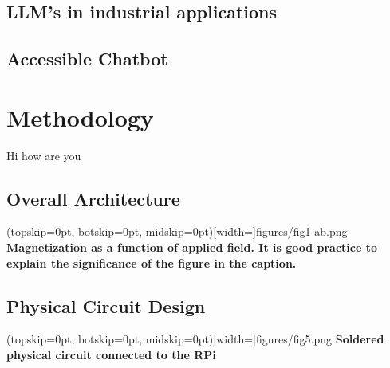 \documentclass{ieeeaccess}
\begin{document}
\subsection{LLM's in industrial applications}
\subsection{Accessible Chatbot }



\section{Methodology}
\label{sec:methodology}

Hi \cite{taylor2010software} how are you

\subsection{Overall Architecture}
\Figure[t!](topskip=0pt, botskip=0pt, midskip=0pt)[width=\textwidth]{{figures/fig1-ab.png}}
{ \textbf{Magnetization as a function of applied field.
It is good practice to explain the significance of the figure in the caption.}\label{fig1}}



\subsection{Physical Circuit Design}

\Figure[t!](topskip=0pt, botskip=0pt,
midskip=0pt)[width=\textwidth]{{figures/fig5.png}}
{ \textbf{Soldered physical circuit connected to the RPi}\label{fig2}}
\end{document}
